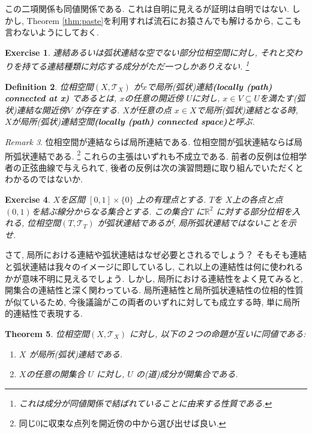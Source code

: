 \documentclass[dvipdfmx]{jbook}
\newtheorem{theorem}{Theorem}[section]
\newtheorem{definition}[theorem]{Definition}
\theoremstyle{remark}
\newtheorem{remark}[theorem]{Remark}
\theoremstyle{plain}
\newtheorem{exercise}[theorem]{Exercise}
\begin{document}
この二項関係も同値関係である. これは自明に見えるが証明は自明ではない.
しかし, Theorem \ref{thm:paste}を利用すれば流石にお猿さんでも解けるから, ここも言わないようにしておく.

\begin{exercise}
	連結あるいは弧状連結な空でない部分位相空間に対し, それと交わりを持てる連結種類に対応する成分がただ一つしかありえない. \footnote{これは成分が同値関係で結ばれていることに由来する性質である.}
\end{exercise}

\begin{definition}
	位相空間$\left( X , \mathcal{T}_{X} \right)$ が$x$で局所(弧状)連結\textbf{(locally (path) connected at x)}
	であるとは, $x$の任意の開近傍 $U$に対し, $x \in V \subseteq U$を満たす(弧状)連結な開近傍$V$ が存在する. 
	$X$が任意の点 $x \in X$で局所(弧状)連結となる時,  $X$が局所(弧状)連結空間\textbf{(locally (path) connected space)}と呼ぶ.
\end{definition}

\begin{remark}
	位相空間が連結ならば局所連結である. 位相空間が弧状連結ならば局所弧状連結である. \footnote{同じ$0$に収束な点列を開近傍の中から選び出せば良い.}
	これらの主張はいずれも不成立である. 前者の反例は位相学者の正弦曲線で与えられて, 後者の反例は次の演習問題に取り組んでいただくとわかるのではないか. 
\end{remark}

\begin{exercise}
	$X$を区間 $[0,1] \times \{0\} $ 上の有理点とする. 
	$T$を $X$上の各点と点$(0,1)$を結ぶ線分からなる集合とする.
	この集合$T$ に$\mathbb{R}^2$ に対する部分位相を入れる, 位相空間$\left( T , \mathcal{T}_{T} \right)$
	が弧状連結であるが, 局所弧状連結ではないことを示せ. 
\end{exercise}

さて, 局所における連結や弧状連結はなぜ必要とされるでしょう？
そもそも連結と弧状連結は我々のイメージに即しているし,
これ以上の連結性は何に使われるかが意味不明に見えるでしょう.
しかし, 局所における連結性をよく見てみると, 開集合の連結性と深く関わっている. 
局所連結性と局所弧状連結性の位相的性質が似ているため, 今後議論がこの両者のいずれに対しても成立する時,
単に局所的連結性で表現する.

\begin{theorem}
	位相空間$\left( X , \mathcal{T}_{X} \right)$ に対し, 以下の２つの命題が互いに同値である: 
	\begin{enumerate}
		\item $X$ が局所(弧状)連結である.
		\item $X$の任意の開集合 $U$ に対し, $U$ の(道)成分が開集合である.
	\end{enumerate}
\end{theorem}
\end{document}
